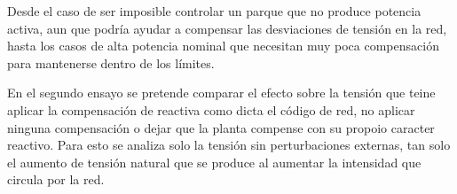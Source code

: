 \documentclass{book}
\begin{document}
\begin{enumerate}[1.]
Desde el caso de ser imposible controlar un parque que no produce potencia activa, aun que podr\'ia ayudar a compensar las desviaciones de tensi\'on en la red, hasta los casos de alta potencia nominal que necesitan muy poca compensaci\'on para mantenerse dentro de los l\'imites. \par

\end{enumerate}

En el segundo ensayo se pretende comparar el efecto sobre la tensi\'on que teine aplicar la compensaci\'on de reactiva como dicta el c\'odigo de red, no aplicar ninguna compensaci\'on o dejar que la planta compense con su propoio caracter reactivo. Para esto se analiza solo la tensi\'on sin perturbaciones externas, tan solo el aumento de tensi\'on natural que se produce al aumentar la intensidad que circula por la red. \par
\end{document}
